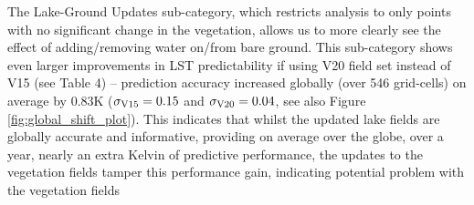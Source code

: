 \documentclass[hess, twostagejnl]{copernicus}
\begin{document}


\noindent The Lake-Ground Updates sub-category, which restricts analysis to only points with no significant change in the vegetation, allows us to more clearly see the effect of adding/removing water on/from bare ground. This sub-category shows even larger improvements in LST predictability if using V20 field set instead of V15 (see Table 4) – prediction accuracy increased globally (over 546 grid-cells) on average by 0.83K ($\sigma_{\rm V15} = 0.15$ and $\sigma_{\rm V20}=0.04$, see also Figure \ref{fig:global_shift_plot}). This indicates that whilst the updated lake fields are globally accurate and informative, providing on average over the globe, over a year, nearly an extra Kelvin of predictive performance, the updates to the vegetation fields tamper this performance gain, indicating potential problem with the vegetation fields
\end{document}
